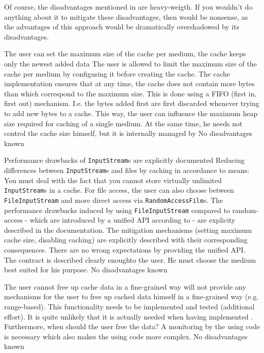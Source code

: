 Of course, the disadvantages mentioned in  are heavy-weigth. If you wouldn't do anything about it to mitigate these disadvantages, then  would be nonsense, as the advantages of this approach would be dramatically overshadowed by its disadvantages.

{%
The user can set the maximum size of the cache per medium, the cache keeps only the newest added data
}
{%
The user is allowed to limit the maximum size of the cache per medium by configuring it before creating the cache. The cache implementation ensures that at any time, the cache does not contain more bytes than which correspond to the maximum size. This is done using a FIFO (first in, first out) mechanism. I.e. the bytes added first are first discarded whenever trying to add new bytes to a cache.
}
{%
This way, the user can influence the maximum heap size required for caching of a single medium. At the same time, he needs not control the cache size himself, but it is internally managed by \COMPmedia{}
}
{%
No disadvantages known
}

{%
Performance drawbacks of \texttt{InputStream}s are explicitly documented
}
{%
Reducing differences between \texttt{InputStream}s and files by caching in accordance to  means: You must deal with the fact that you cannot store virtually unlimited \texttt{InputStream}s in a cache. For file access, the user can also choose between \texttt{FileInputStream} and more direct access via \texttt{RandomAccessFile}s. The performance drawbacks induced by using \texttt{FileInputStream} compared to  random-access \-- which are introduced by a unified API according to  \-- are explicity described in the \LibName{} documentation. The mitigation mechanisms (setting maximum cache size, disabling caching) are explicitly described with their corresponding consequences.
}
{%
There are no wrong expectations by providing the unified API. The contract is described clearly enoughto the user. He must choose the medium best suited for his purpose.
}
{%
No disadvantages known
}

{%
The user cannot free up cache data in a fine-grained way
}
{%
\COMPmedia{} will not provide any mechanisms for the user to free up cached data himself in a fine-grained way (e.g. range-based).
}
{%
This functionality needs to be implemented and tested (additional effort). It is quite unlikely that it is actually needed when having implemented . Furthermore, when should the user free the data? A monitoring by the using code is necessary which also makes the using code more complex.
}
{%
No disadvantages known
}

